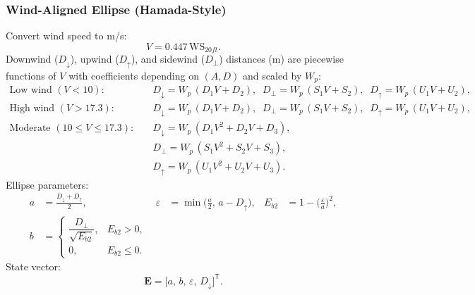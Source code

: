 \documentclass[../report/case_report.tex]{subfiles}
\begin{document}
\subsubsection*{Wind-Aligned Ellipse (Hamada-Style)}
Convert wind speed to m/s:
\begin{equation}
  V=0.447\,\mathrm{WS}_{20ft}.
\end{equation}
Downwind ($D_\downarrow$), upwind ($D_\uparrow$), and sidewind ($D_\perp$) distances (m) are piecewise functions of $V$ with coefficients depending on $(A,D)$ and scaled by $W_p$:
\begin{align}
\text{Low wind }(V<10):\quad
&D_\downarrow = W_p\,(D_1V + D_2),\;\;
D_\perp      = W_p\,(S_1V + S_2),\;\;
D_\uparrow   = W_p\,(U_1V + U_2),\\[4pt]
\text{High wind }(V>17.3):\quad
&D_\downarrow = W_p\,(D_1V + D_2),\;\;
D_\perp      = W_p\,(S_1V + S_2),\;\;
D_\uparrow   = W_p\,(U_1V + U_2),\\[4pt]
\text{Moderate }(10\le V\le 17.3):\quad
&D_\downarrow = W_p\,(D_1V^2 + D_2V + D_3),\nonumber\\[-2pt]
&D_\perp      = W_p\,(S_1V^2 + S_2V + S_3),\nonumber\\[-2pt]
&D_\uparrow   = W_p\,(U_1V^2 + U_2V + U_3).\nonumber
\end{align}
Ellipse parameters:
\begin{align}
  a &= \frac{D_\downarrow + D_\uparrow}{2}, &
  \varepsilon &= \min\!\Big(\tfrac{a}{2},\, a-D_\uparrow\Big), &
  E_{b2} &= 1-\Big(\tfrac{\varepsilon}{a}\Big)^2,\\
  b &= \begin{cases}
  \dfrac{D_\perp}{\sqrt{E_{b2}}}, & E_{b2}>0,\\[6pt]
  0, & E_{b2}\le 0.
  \end{cases}
\end{align}
State vector:
\[
\mathbf{E}=\big[a,\, b,\, \varepsilon,\, D_\downarrow\big]^{\mathsf T}.
\]
\end{document}
